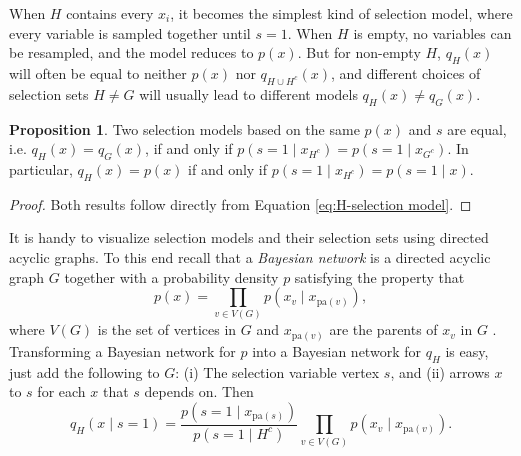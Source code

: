 \documentclass{article}
\theoremstyle{plain}
\theoremstyle{definition}
\newtheorem{prop}[theorem]{Proposition}
\begin{document}
When $H$ contains every $x_i$, it becomes the simplest kind of selection model, where every variable is sampled together until $s=1$. When $H$ is empty, no variables can be resampled, and the model reduces to $p\left(x\right)$. But for non-empty $H$, $q_{H}(x)$ will often be equal to neither $p(x)$ nor $q_{H\cup H^c}(x)$, and different choices of selection sets $H\neq G$ will usually lead to different models $q_{H}(x)\neq q_{G}(x)$. 
\begin{prop}
\label{prop:Equal selection models}Two selection models based on the same $p(x)$ and $s$ are equal, i.e. $q_{H}(x)=q_{G}(x)$, if and only if $p\left(s=1\mid x_{H^{c}}\right)=p\left(s=1\mid x_{G^{c}}\right)$.
In particular, $q_{H}(x)=p(x)$ if and only if $p\left(s=1\mid x_{H^{c}}\right)=p\left(s=1\mid x\right)$.
\end{prop}

\begin{proof}
Both results follow directly from Equation \eqref{eq:H-selection model}.
\end{proof}

It is handy to visualize selection models and their selection sets using directed acyclic graphs. To this end recall that a \emph{Bayesian network} is a directed acyclic graph $G$ together with a probability
density $p$ satisfying the property that $$p\left(x\right)=\prod_{v\in V\left(G\right)}p\left(x_{v}\mid x_{\textrm{pa}\left(v\right)}\right),$$ where $V\left(G\right)$ is the set of vertices in $G$ and $x_{\textrm{pa}\left(v\right)}$ are the parents of $x_{v}$ in $G$ \citep{Pearl2014}.
Transforming a Bayesian network for $p$ into a Bayesian network for $q_{H}$ is easy, just add the following to $G$: (i) The selection variable vertex $s$, and (ii) arrows $x$ to $s$ for each $x$ that $s$ depends on. Then
\begin{equation}
q_{H}\left(x\mid s=1\right)=\frac{p\left(s=1\mid x_{\textrm{pa}\left(s\right)}\right)}{p\left(s=1\mid H^{c}\right)}\prod_{v\in V\left(G\right)}p\left(x_{v}\mid x_{\textrm{pa}\left(v\right)}\right)\label{eq:DAG, selection model}.
\end{equation}
\end{document}

